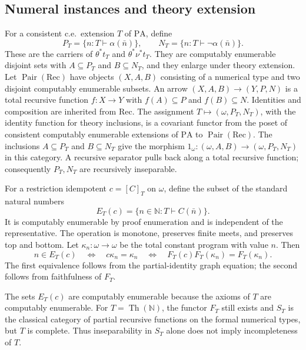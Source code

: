 \documentclass[11pt]{article}
\newcommand{\N}{\mathbb N}
\newcommand{\PA}{\mathrm{PA}}
\begin{document}
\subsection{Numeral instances and theory extension}

For a consistent c.e.\ extension $T$ of $\PA$, define
\[
 P_T=\{n:T\vdash\alpha(\bar n)\},\qquad
 N_T=\{n:T\vdash\neg\alpha(\bar n)\}.
\]
These are the carriers of $\theta^*t_T$ and $\theta^*\nu^*t_T$.
They are computably enumerable disjoint sets with $A\subseteq P_T$
and $B\subseteq N_T$, and they enlarge under theory extension.
Let $\operatorname{Pair}(\mathrm{Rec})$ have objects $(X,A,B)$ consisting
of a numerical type and two disjoint computably enumerable subsets.
An arrow $(X,A,B)\to(Y,P,N)$ is a total recursive function $f:X\to Y$
with $f(A)\subseteq P$ and $f(B)\subseteq N$. Identities and composition
are inherited from $\mathrm{Rec}$. The assignment
$T\mapsto(\omega,P_T,N_T)$, with the identity function for theory
inclusions, is a covariant functor from the poset of consistent
computably enumerable extensions of $\PA$ to
$\operatorname{Pair}(\mathrm{Rec})$.
The inclusions $A\subseteq P_T$ and $B\subseteq N_T$ give the morphism
$1_\omega:(\omega,A,B)\to(\omega,P_T,N_T)$ in this category.
A recursive separator pulls back along a total recursive function;
consequently $P_T,N_T$ are recursively inseparable.


For a restriction idempotent
$c=[C]_T$ on $\omega$, define the subset of the standard natural numbers
\begin{equation}\label{eq:observation}
 E_T(c)=\{n\in\N:T\vdash C(\bar n)\}.
\end{equation}
It is computably enumerable by proof enumeration and is independent of
the representative. The operation is monotone, preserves finite meets,
and preserves top and bottom. Let $\kappa_n:\omega\to\omega$ be the
total constant program with value $n$. Then
\begin{equation}\label{eq:faithful-observation}
 n\in E_T(c)
 \quad\Longleftrightarrow\quad c\kappa_n=\kappa_n
 \quad\Longleftrightarrow\quad
 F_T(c)F_T(\kappa_n)=F_T(\kappa_n).
\end{equation}
The first equivalence follows from the partial-identity graph equation;
the second follows from faithfulness of $F_T$.


The sets $E_T(c)$ are computably enumerable because the axioms of $T$
are computably enumerable. For $T=\operatorname{Th}(\N)$, the functor
$F_T$ still exists and $S_T$ is the classical category of partial
recursive functions on the formal numerical types, but $T$ is complete.
Thus inseparability in $S_T$ alone does not imply incompleteness of $T$.
\end{document}
